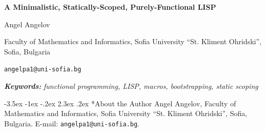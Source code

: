 \documentclass[12pt,a4paper]{article}
\makeatletter
\newif\ifblindreview
\newcommand{\keywords}[1]{%
  \par
  {\fontsize{10}{12}\selectfont\bfseries\itshape Keywords:}\hspace{0.5em}%
  {\fontsize{10}{12}\selectfont\itshape #1}%
  \par\medskip}
\renewcommand\section{\@startsection{section}{1}{\z@}%
  {-3.5ex \@plus -1ex \@minus -.2ex}%
  {2.3ex \@plus.2ex}%
  {\normalfont\bfseries}}
\makeatother
\begin{document}
\begin{center}
  {\fontsize{14}{17}\selectfont\bfseries
    A Minimalistic, Statically-Scoped, Purely-Functional LISP\par}
  \ifblindreview\else
    \vspace{6pt}
    {\normalsize Angel Angelov\par}
    {\normalsize Faculty of Mathematics and Informatics, Sofia University
      ``St. Kliment Ohridski'', Sofia, Bulgaria\par}
    {\normalsize \texttt{angelpa1@uni-sofia.bg}\par}
  \fi
\end{center}
\vspace{6pt}


\keywords{functional programming, LISP, macros,
  bootstrapping, static scoping}









\ifblindreview\else
  \section*{About the Author}
  Angel Angelov, Faculty of Mathematics and Informatics, Sofia University
  ``St. Kliment Ohridski'', Sofia, Bulgaria.
  E-mail: \texttt{angelpa1@uni-sofia.bg}.
\fi
\end{document}
